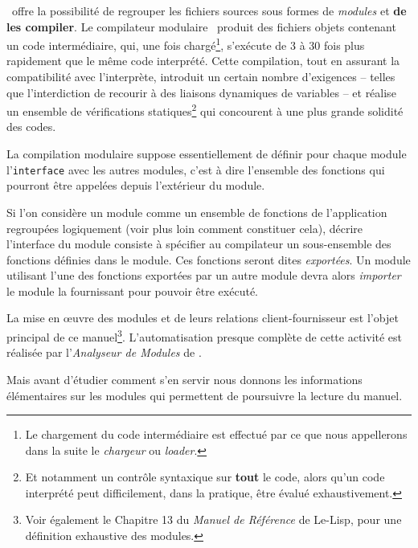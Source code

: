 \LeLisp\ offre la possibilit\'{e} de regrouper les fichiers
sources sous formes de {\em modules} et {\bf de les compiler}.
Le compilateur modulaire \LeLisp\ produit des fichiers objets
contenant un code interm\'{e}diaire, qui, une fois 
charg\'{e}\footnote{Le chargement du code interm\'{e}diaire est effectu\'{e}
par ce que nous appellerons dans la suite le {\em chargeur}
ou {\em loader}.}, s'ex\'{e}cute
de 3 \`{a} 30 fois plus rapidement que le m\^{e}me code interpr\'{e}t\'{e}.
Cette compilation, tout en assurant la compatibilit\'{e} avec 
l'interpr\`{e}te, introduit un certain nombre d'exigences -- 
telles que l'interdiction de recourir
\`{a} des liaisons dynamiques de variables -- et r\'{e}alise un
ensemble de v\'{e}rifications statiques\footnote{Et notamment un
contr\^{o}le syntaxique sur {\bf tout} le code, alors qu'un
code interpr\'{e}t\'{e} peut difficilement, dans la pratique,
\^{e}tre \'{e}valu\'{e} exhaustivement.} qui concourent \`{a}
une plus grande solidit\'{e} des codes.



La compilation modulaire suppose essentiellement de d\'{e}finir
pour chaque module l'{\tt interface}
avec les autres modules, c'est \`{a} dire l'ensemble des fonctions
qui pourront \^{e}tre appel\'{e}es depuis l'ext\'{e}rieur du module.

Si l'on consid\`{e}re un module comme un ensemble de fonctions de 
l'application regroup\'{e}es logiquement
(voir plus loin comment constituer cela),
d\'{e}crire l'interface du module consiste \`{a}
sp\'{e}cifier au compilateur un sous-ensemble des fonctions
d\'{e}finies dans le module. Ces fonctions seront dites
{\em export\'{e}es}.
Un module utilisant l'une des fonctions export\'{e}es par un
autre module devra alors {\em importer} le module la fournissant pour 
pouvoir \^{e}tre ex\'{e}cut\'{e}.

La mise en \oe uvre des modules et de leurs relations client-fournisseur
est l'objet principal de ce manuel\footnote{Voir \'{e}galement
le Chapitre 13 du {\em Manuel de R\'{e}f\'{e}rence} de Le-Lisp, pour
une d\'{e}finition exhaustive des modules.}.
L'automatisation presque compl\`{e}te
de cette activit\'{e} est r\'{e}alis\'{e}e par l'{\em Analyseur de Modules}
de \LeLisp.

Mais avant d'\'{e}tudier comment s'en servir nous donnons les
informations \'{e}l\'{e}mentaires sur les modules qui permettent
de poursuivre la lecture du manuel.



